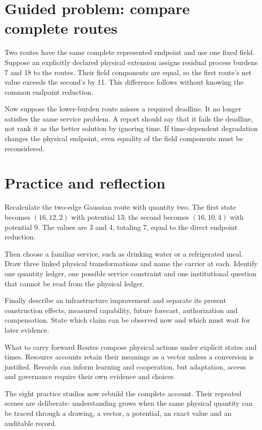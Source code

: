 \section{Guided problem: compare complete routes}
Two routes have the same complete represented endpoint and use one fixed field. Suppose an explicitly declared physical extension assigns residual process burdens 7 and 18 to the routes. Their field components are equal, so the first route's net value exceeds the second's by 11. This difference follows without knowing the common endpoint reduction.

Now suppose the lower-burden route misses a required deadline. It no longer satisfies the same service problem. A report should say that it fails the deadline, not rank it as the better solution by ignoring time. If time-dependent degradation changes the physical endpoint, even equality of the field components must be reconsidered.

\section{Practice and reflection}
Recalculate the two-edge Gaussian route with quantity two. The first state becomes $(16,12,2)$ with potential 13; the second becomes $(16,10,4)$ with potential 9. The values are 3 and 4, totaling 7, equal to the direct endpoint reduction.

Then choose a familiar service, such as drinking water or a refrigerated meal. Draw three linked physical transformations and name the carrier at each. Identify one quantity ledger, one possible service constraint and one institutional question that cannot be read from the physical ledger.

Finally describe an infrastructure improvement and separate its present construction effects, measured capability, future forecast, authorization and compensation. State which claim can be observed now and which must wait for later evidence.

\begin{intuitionbox}{What to carry forward}
Routes compose physical actions under explicit states and times. Resource accounts retain their meanings as a vector unless a conversion is justified. Records can inform learning and cooperation, but adaptation, access and governance require their own evidence and choices.
\end{intuitionbox}

The eight practice studios now rebuild the complete account. Their repeated scenes are deliberate: understanding grows when the same physical quantity can be traced through a drawing, a vector, a potential, an exact value and an auditable record.
